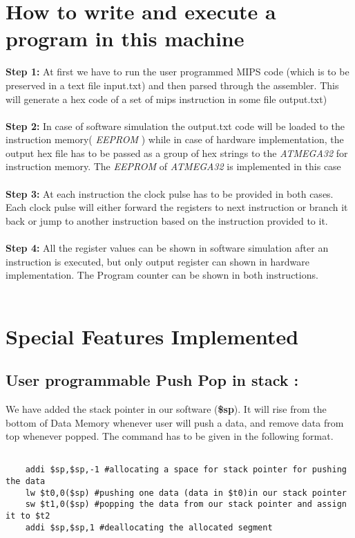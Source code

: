 \documentclass[12pt]{article}
\begin{document}
\section{How to write and execute a program in this machine}
    \textbf{Step 1: } At first we have to run the user programmed MIPS code (which is to be preserved in a text file input.txt) and then parsed through the assembler. This will generate a hex code of a set of mips instruction in some file output.txt) \\ \\
    \textbf{Step 2: } In case of software simulation the output.txt code will be loaded to the instruction memory( \textit{EEPROM} ) while in case of hardware implementation, the output hex file has to be passed as a group of hex strings to the \textit{ATMEGA32} for instruction memory. The \textit{EEPROM} of \textit{ATMEGA32} is implemented in this case\\ \\
    \textbf{Step 3: } At each instruction the clock pulse has to be provided in both cases. Each clock pulse will either forward the registers to next instruction or branch it back or jump to another instruction based on the instruction provided to it.\\ \\
    \textbf{Step 4: } All the register values can be shown in software simulation after an instruction is executed, but only output register can shown in hardware implementation.
    The Program counter can be shown in both instructions.\\ \\ 
    
\section{Special Features Implemented}

\subsection{User programmable Push Pop in stack : }

We have added the stack pointer in our software (\textbf{\$sp}). It will rise from the bottom of Data Memory whenever user will push a data, and remove data from top whenever popped. The command has to be given in the following format.

\begin{verbatim}

    addi $sp,$sp,-1 #allocating a space for stack pointer for pushing the data
    lw $t0,0($sp) #pushing one data (data in $t0)in our stack pointer
    sw $t1,0($sp) #popping the data from our stack pointer and assign it to $t2
    addi $sp,$sp,1 #deallocating the allocated segment
    
\end{verbatim}
\end{document}
